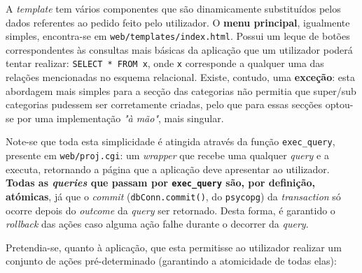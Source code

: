 \documentclass[12pt,a4paper]{article}
\begin{document}
A \textit{template} tem vários componentes que são dinamicamente substituídos
pelos dados referentes ao pedido feito pelo utilizador. O \textbf{menu principal},
igualmente simples, encontra-se em \texttt{web/templates/index.html}. Possui um
leque de botões correspondentes às consultas mais básicas da aplicação que um
utilizador poderá tentar realizar: \texttt{SELECT * FROM x}, onde \texttt{x} corresponde a qualquer
uma das relações mencionadas no esquema relacional. Existe, contudo, uma \textbf{exceção}:
esta abordagem mais simples para a secção das categorias não permitia que
super/sub categorias pudessem ser corretamente criadas, pelo que para essas secções
optou-se por uma implementação \textit{"à mão"}, mais singular.

Note-se que toda esta simplicidade é atingida através da função \texttt{exec\_query},
presente em \texttt{web/proj.cgi}: um \textit{wrapper} que recebe uma qualquer
\textit{query} e a executa, retornando a página que a aplicação deve apresentar
ao utilizador. \textbf{Todas as \textit{queries} que passam por \texttt{exec\_query} são,
  por definição, atómicas}, já que o \textit{commit} (\texttt{dbConn.commit()}, do \texttt{psycopg})
da \textit{transaction} só ocorre depois do \textit{outcome} da \textit{query}
ser retornado. Desta forma, é garantido o \textit{rollback} das ações caso alguma
ação falhe durante o decorrer da \textit{query}.

\vspace*{0.5cm}

Pretendia-se, quanto à aplicação, que esta permitisse ao utilizador realizar um conjunto
de ações pré-determinado (garantindo a atomicidade de todas elas):
\end{document}
